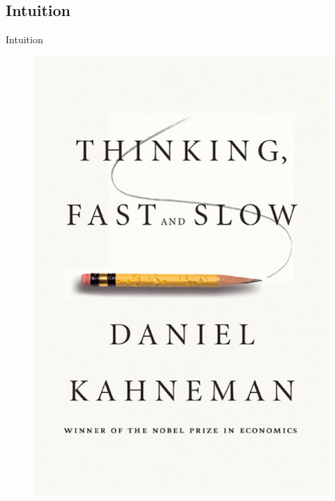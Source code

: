 \subsection{Intuition}
\begin{frame}{Intuition}
    \begin{figure}
        \begin{minipage}[t]{0.30\linewidth}
            \centering
            \vspace{0pt}
            \includegraphics[width=\textwidth]{img/TFS.jpg}

\end{minipage}
\end{figure}
\end{frame}
